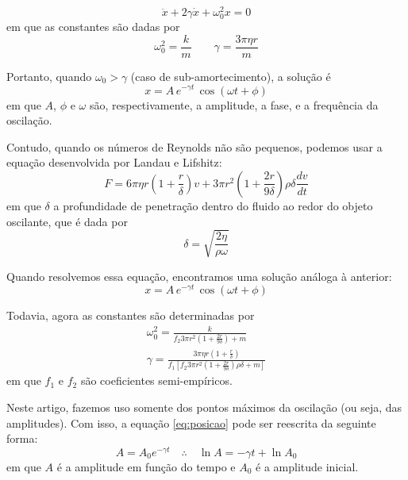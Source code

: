 \documentclass[a4paper, 12pt]{article}
\begin{document}
\begin{multicols}{2}
			\begin{equation}
				\ddot{x} + 2 \gamma \dot{x} + \omega_0^2 x = 0
			\end{equation}
			em que as constantes são dadas por
			\begin{equation} \label{eq:constantes-stokes}
				\omega_0^2 = \frac{k}{m} \qquad \gamma = \frac{3 \pi \eta r}{m}
			\end{equation}
			\par Portanto, quando $\omega_0 > \gamma$ (caso de sub-amortecimento), a solução é
			\begin{equation}
				x = A \, e^{- \gamma t} \, \cos (\omega t + \phi)
			\end{equation}
			em que $A$, $\phi$ e $\omega$ são, respectivamente, a amplitude, a fase, e a frequência da oscilação.
			\par Contudo, quando os números de Reynolds não são pequenos, podemos usar a equação desenvolvida por Landau e Lifshitz:
			\small \begin{equation} \label{eq:landau}
				F = 6 \pi \eta r \left(1 + \frac{r}{\delta} \right) v + 3 \pi r^2 \left( 1 + \frac{2 r}{9 \delta} \right) \rho \delta \dfrac{d v}{d t}
			\end{equation} \normalsize
			em que $\delta$ a profundidade de penetração dentro do fluido ao redor do objeto oscilante, que é dada por
			\begin{equation}
				\delta = \sqrt{\frac{2 \eta}{\rho \omega}}
			\end{equation}
			\par Quando resolvemos essa equação, encontramos uma solução análoga à anterior:
			\begin{equation} \label{eq:posicao}
				x = A \, e^{- \gamma t} \, \cos (\omega t + \phi)
			\end{equation}
			\par Todavia, agora as constantes são determinadas por
			\begin{equation} \label{eq:constantes-landau} \begin{split}
				\omega_0^2 = \frac{k}{f_2 3 \pi r^2 \left(1 + \frac{2 r}{9 \delta} \right) + m} \\
				\gamma = \frac{3 \pi \eta r \left(1+ \frac{r}{\delta} \right)}{f_1 \left[ f_2 3 \pi r^2 \left(1+\frac{2 r}{9 \delta} \right) \rho \delta + m \right]}
			\end{split} \end{equation}
			em que $f_1$ e $f_2$ são coeficientes semi-empíricos.
			\par Neste artigo, fazemos uso somente dos pontos máximos da oscilação (ou seja, das amplitudes). Com isso, a equação \hyperref[eq:posicao]{\ref{eq:posicao}} pode ser reescrita da seguinte forma:
			\begin{equation} \label{eq:amplitudes}
				A = A_0 e^{- \gamma t} \quad \therefore \quad \ln A = - \gamma t + \ln A_0
			\end{equation}
			em que $A$ é a amplitude em função do tempo e $A_0$ é a amplitude inicial.
			

\end{multicols}
\end{document}
